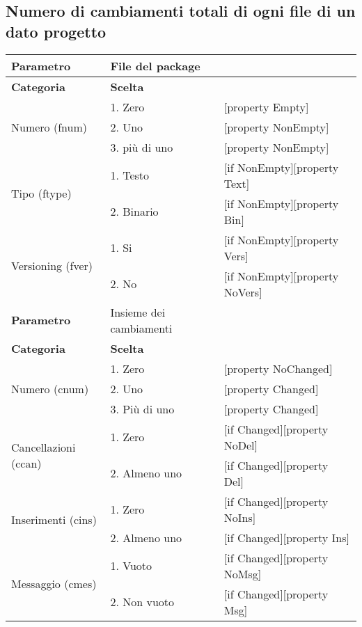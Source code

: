 \clearpage

\subsection{Numero di cambiamenti totali di ogni file di un dato progetto}
		
		\begin{table}[ht]
		\footnotesize
		\centering
			\begin{tabular}{|p{4cm}|p{4cm}p{5cm}|}
				\hline
				\cellcolor{Gray} \textbf{Parametro}		& File del package	&											\tabularnewline
				\hline
				\rowcolor{Gray}
				\textbf{Categoria} 						& \textbf{Scelta}			&									\tabularnewline
				\hline
				\multirow{3}{*}{Numero (fnum)} 			& 1. Zero 					&	[property Empty] 				\tabularnewline
				\cline{2-3}
														& 2. Uno 					&	[property NonEmpty]				\tabularnewline
				\cline{2-3}
														& 3. più di uno 			&	[property NonEmpty]				\tabularnewline
				\hline
				\multirow{2}{*}{Tipo (ftype)} 			& 1. Testo					&	[if NonEmpty][property Text] 	\tabularnewline
				\cline{2-3}
														& 2. Binario				&	[if NonEmpty][property Bin]		\tabularnewline
				\hline
				\multirow{2}{*}{Versioning (fver)}		& 1. Si						&	[if NonEmpty][property Vers]	\tabularnewline
				\cline{2-3}
														& 2. No						&	[if NonEmpty][property NoVers]	\tabularnewline
				\hline
				
				
				\cellcolor{Gray} \textbf{Parametro}		& Insieme dei cambiamenti	&									\tabularnewline
				\hline
				\rowcolor{Gray}
				\textbf{Categoria} 						& \textbf{Scelta}			&									\tabularnewline
				\hline
				\multirow{3}{*}{Numero (cnum)} 			& 1. Zero 					&	[property NoChanged]			\tabularnewline
				\cline{2-3}
														& 2. Uno					&	[property Changed]				\tabularnewline
				\cline{2-3}
														& 3. Più di uno				&	[property Changed]				\tabularnewline
				\hline
				\multirow{2}{*}{Cancellazioni (ccan)} 	& 1. Zero	 				&	[if Changed][property NoDel] 	\tabularnewline
				\cline{2-3}
														& 2. Almeno uno				&	[if Changed][property Del]		\tabularnewline
				\hline
				\multirow{2}{*}{Inserimenti (cins)} 	& 1. Zero 					&	[if Changed][property NoIns] 	\tabularnewline
				\cline{2-3}
														& 2. Almeno uno 			&	[if Changed][property Ins]		\tabularnewline
				\hline
				\multirow{2}{*}{Messaggio (cmes)} 		& 1. Vuoto 					&	[if Changed][property NoMsg] 	\tabularnewline
				\cline{2-3}
														& 2. Non vuoto 				&	[if Changed][property Msg]		\tabularnewline
				\hline			
				
			\end{tabular}
		\end {table}

